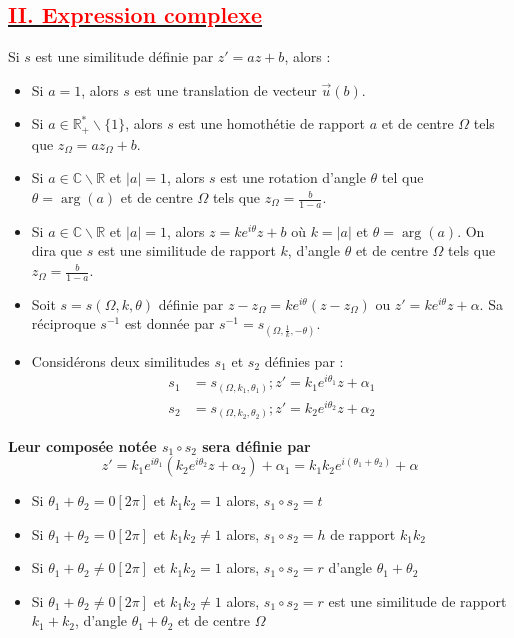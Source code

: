 \documentclass[12pt]{article}
\begin{document}
\subsection*{\underline{\textbf{\textcolor{red}{II. Expression complexe}}}}
Si $s$ est une similitude définie par $z' = az + b$, alors :
\begin{itemize}
    \item Si $a = 1$, alors $s$ est une translation de vecteur $\overrightarrow{u}(b)$.
    \item Si $a \in \mathbb{R}^*_+ \backslash \{1\}$, alors $s$ est une homothétie de rapport $a$ et de centre $\Omega$ tels que $z_\Omega = az_\Omega + b$.
    \item Si $a \in \mathbb{C} \backslash \mathbb{R}$ et $|a| = 1$, alors $s$ est une rotation d'angle $\theta$ tel que $\theta = \arg(a)$ et de centre $\Omega$ tels que $z_\Omega = \frac{b}{1-a}$.
    \item Si $a \in \mathbb{C} \backslash \mathbb{R}$ et $|a| = 1$, alors $z = ke^{i\theta}z + b$ où $k = |a|$ et $\theta = \arg(a)$. On dira que $s$ est une similitude de rapport $k$, d'angle $\theta$ et de centre $\Omega$ tels que $z_\Omega = \frac{b}{1-a}$.\\
    \item Soit $s = s(\Omega,k,\theta)$ définie par $z - z_\Omega = ke^{i\theta} (z - z_\Omega)$ ou $z' = ke^{i\theta} z + \alpha$.
  Sa réciproque $s^{-1}$ est donnée par $s^{-1} = s_{(\Omega, \frac{1}{k} ,- \theta)}$.\\
    \item Considérons deux similitudes $s_1$ et $s_2$ définies par :
    \begin{align*}
        s_1 &= s_{(\Omega,k_1 ,\theta_1)} ; z' = k_1 e^{i\theta_1} z + \alpha_1 \\
        s_2 &= s_{(\Omega,k_2 ,\theta_2)} ; z' = k_2 e^{i\theta_2} z + \alpha_2
    \end{align*}
\end{itemize}
\textbf{Leur composée notée $s_1 \circ s_2$ sera définie par}
\[ z' = k_1 e^{i\theta_1} (k_2 e^{i\theta_2} z + \alpha_2) + \alpha_1 = k_1 k_2 e^{i(\theta_1 + \theta_2)} + \alpha \]

\begin{itemize}
    \item Si $\theta_1 + \theta_2 = 0[2\pi]$ et $k_1 k_2 = 1$ alors, $s_1 \circ s_2 = t$
    \item Si $\theta_1 + \theta_2 = 0[2\pi]$ et $k_1 k_2 \neq 1$ alors, $s_1 \circ s_2 = h$ de rapport $k_1 k_2$
    \item Si $\theta_1 + \theta_2 \neq 0[2\pi]$ et $k_1 k_2 = 1$ alors, $s_1 \circ s_2 = r$ d’angle $\theta_1 + \theta_2$
    \item Si $\theta_1 + \theta_2 \neq 0[2\pi]$ et $k_1 k_2 \neq 1$ alors, $s_1 \circ s_2 = r$ est une similitude de rapport $k_1 + k_2$, d’angle $\theta_1 + \theta_2$ et de centre $\Omega$
\end{itemize}
\end{document}
